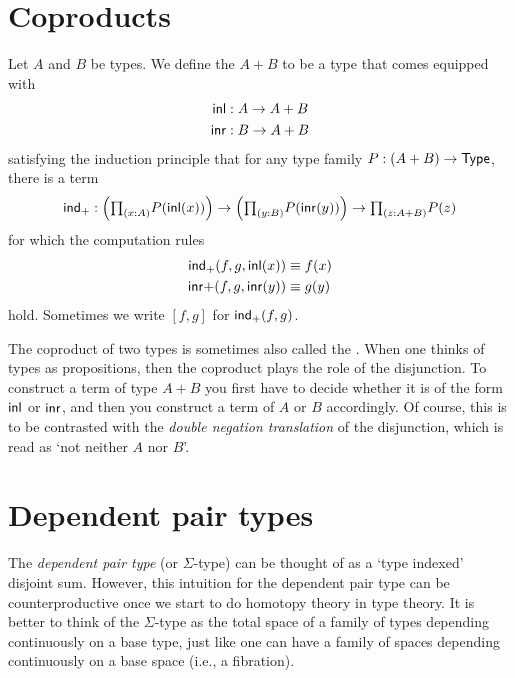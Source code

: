 \section{Coproducts}
\begin{defn}
Let $A$ and $B$ be types. We define the  $A+B$ to be a type that comes equipped with
\begin{align*}
{\mathsf{inl}} & : A \to A+B \\
{\mathsf{inr}} & : B \to A+B
\end{align*}
satisfying the induction principle that for any type family $P:(A+B)\to\mathsf{Type}$, there is a term
\begin{equation*}
\ind{+} : \Big(\prd{x:A}P(\inl(x))\Big)\to\Big(\prd{y:B}P(\inr(y))\Big)\to\prd{z:A+B}P(z)
\end{equation*}
for which the computation rules
\begin{align*}
\mathsf{ind}_{+}(f,g,{\mathsf{inl}}(x)) & \equiv f(x) \\
{\mathsf{inr}}{+}(f,g,{\mathsf{inr}}(y)) & \equiv g(y)
\end{align*}
hold. Sometimes we write $[f,g]$ for $\mathsf{ind}_{+}(f,g)$.
\end{defn}

The coproduct of two types is sometimes also called the .
When one thinks of types as propositions, then the coproduct plays the role of the disjunction.
To construct a term of type $A+B$ you first have to decide whether it is of the form ${\mathsf{inl}}$ or ${\mathsf{inr}}$, and then you construct a term of $A$ or $B$ accordingly. Of course, this is to be contrasted with the \emph{double negation translation} of the disjunction, which is read as `not neither $A$ nor $B$'. 

\section{Dependent pair types}
The \emph{dependent pair type} (or $\Sigma$-type) can be thought of as a `type indexed' disjoint sum.
However, this intuition for the dependent pair type can be counterproductive once we start to do homotopy theory in type theory.
It is better to think of the $\Sigma$-type as the total space of a family of types depending continuously on a base type, just like one can have a family of spaces depending continuously on a base space (i.e., a fibration).

